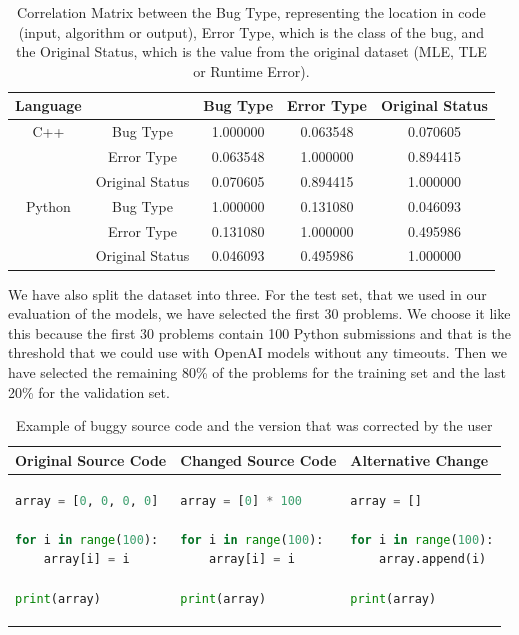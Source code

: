\documentclass[12pt,a4paper]{report}
\begin{document}
\begin{table}[htbp]
\centering
\begin{tabular}{|c|c|c|c|c|}
\hline
\multicolumn{1}{|c|}{Language} &  & Bug Type & Error Type & Original Status \\
\hline
C++ & Bug Type & 1.000000 & 0.063548 & 0.070605 \\
\cline{2-5}
& Error Type & 0.063548 & 1.000000 & 0.894415 \\
\cline{2-5}
& Original Status & 0.070605 & 0.894415 & 1.000000 \\
\hline
Python & Bug Type & 1.000000 & 0.131080 & 0.046093 \\
\cline{2-5}
& Error Type & 0.131080 & 1.000000 & 0.495986 \\
\cline{2-5}
& Original Status & 0.046093 & 0.495986 & 1.000000 \\
\hline
\end{tabular}
\caption{Correlation Matrix between the Bug Type, representing the location in code (input, algorithm or output), Error Type, which is the class of the bug, and the Original Status, which is the  value from the original dataset (MLE, TLE or Runtime Error).}
\label{tab:correlation}
\end{table}

We have also split the dataset into three. For the test set, that we used in our evaluation of the models, we have selected the first 30 problems. We choose it like this because the first 30 problems contain 100 Python submissions and that is the threshold that we could use with OpenAI models without any timeouts. Then we have selected the remaining 80\% of the problems for the training set and the last 20\% for the validation set.

\begin{table}[H]\small\linespread{1}
\centering
\caption{Example of buggy source code and the version that was corrected by the user}
\label{tab:experiments7}
\begin{tabular}{p{5cm} p{5cm} p{5cm}}
\textbf{Original Source Code} & \textbf{Changed Source Code} & \textbf{Alternative Change} \\
\hline
\begin{lstlisting}[language=Python]
array = [0, 0, 0, 0]

for i in range(100):
    array[i] = i

print(array)
\end{lstlisting} & \begin{lstlisting}[language=Python]
array = [0] * 100

for i in range(100):
    array[i] = i

print(array)
\end{lstlisting} & \begin{lstlisting}[language=Python]
array = []

for i in range(100):
    array.append(i)

print(array)
\end{lstlisting} \\
\end{tabular}
\end{table}
\end{document}
